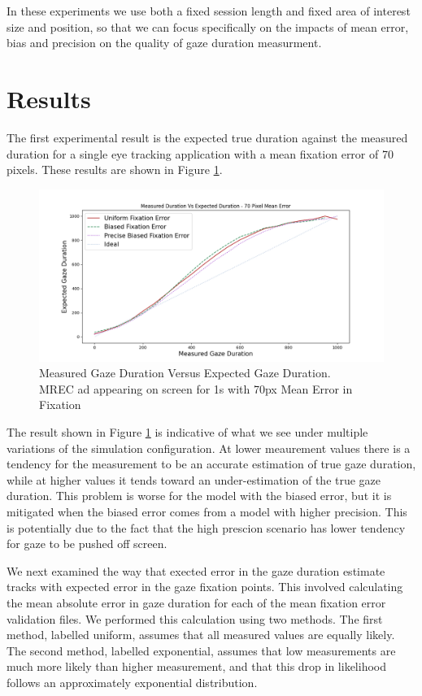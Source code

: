 \documentclass[12pt,a4paper]{article}
\numberwithin{equation}{section}
\begin{document}
In these experiments we use both a fixed session length and fixed area of interest
size and position, so that we can focus specifically on the impacts of mean
error, bias and precision on the quality of gaze duration measurment.

\section{Results}

The first experimental result is the expected true duration against the measured duration
for a single eye tracking application with a mean fixation error of 70 pixels. These
results are shown in Figure \ref{fig:measured_vs_expected}.

\begin{figure}[h!]
\includegraphics[scale=0.5]{../results/Measured_vs_expected.png}
\caption{Measured Gaze Duration Versus Expected Gaze Duration. \\\hspace{\textwidth} 
MREC ad appearing on screen for 1s with 70px Mean Error in Fixation}
\label{fig:measured_vs_expected}
\end{figure}

The result shown in Figure \ref{fig:measured_vs_expected} is indicative of what we 
see under multiple variations of the simulation configuration. 
At lower meaurement values there is a tendency for the measurement to be an 
accurate estimation of true gaze duration, while 
at higher values it tends toward an under-estimation of the true gaze duration.
This problem is worse for the model with the biased error, but it is mitigated
when the biased error comes from a model with higher precision. This is potentially
due to the fact that the high prescion scenario has lower tendency for gaze to be 
pushed off screen.  

We next examined the way that exected error in the gaze duration estimate tracks with 
expected error in the gaze fixation points. This involved calculating the mean absolute
error in gaze duration for each of the mean fixation error validation files. 
We performed this calculation using two methods. The first method, labelled uniform, 
assumes that all measured values are equally likely. The second method, labelled exponential,
assumes that low measurements are much more likely than higher measurement, and that 
this drop in likelihood follows an approximately exponential distribution.
\end{document}
